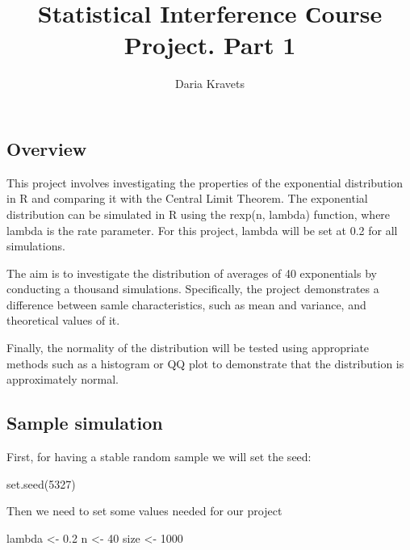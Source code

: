 \documentclass[
]{article}
\title{Statistical Interference Сourse Project. Part 1}
\author{Daria Kravets}
\date{}
\newenvironment{Shaded}{\begin{snugshade}}{\end{snugshade}}
\newcommand{\DecValTok}[1]{\textcolor[rgb]{0.00,0.00,0.81}{#1}}
\newcommand{\FloatTok}[1]{\textcolor[rgb]{0.00,0.00,0.81}{#1}}
\newcommand{\FunctionTok}[1]{\textcolor[rgb]{0.00,0.00,0.00}{#1}}
\newcommand{\NormalTok}[1]{#1}
\newcommand{\OtherTok}[1]{\textcolor[rgb]{0.56,0.35,0.01}{#1}}
\begin{document}
\maketitle

\hypertarget{overview}{%
\subsection{Overview}\label{overview}}

This project involves investigating the properties of the exponential
distribution in R and comparing it with the Central Limit Theorem. The
exponential distribution can be simulated in R using the rexp(n, lambda)
function, where lambda is the rate parameter. For this project, lambda
will be set at 0.2 for all simulations.

The aim is to investigate the distribution of averages of 40
exponentials by conducting a thousand simulations. Specifically, the
project demonstrates a difference between samle characteristics, such as
mean and variance, and theoretical values of it.

Finally, the normality of the distribution will be tested using
appropriate methods such as a histogram or QQ plot to demonstrate that
the distribution is approximately normal.

\hypertarget{sample-simulation}{%
\subsection{Sample simulation}\label{sample-simulation}}

First, for having a stable random sample we will set the seed:

\begin{Shaded}
\begin{Highlighting}[]
\FunctionTok{set.seed}\NormalTok{(}\DecValTok{5327}\NormalTok{)}
\end{Highlighting}
\end{Shaded}

Then we need to set some values needed for our project

\begin{Shaded}
\begin{Highlighting}[]
\NormalTok{lambda }\OtherTok{\textless{}{-}} \FloatTok{0.2}
\NormalTok{n }\OtherTok{\textless{}{-}} \DecValTok{40}
\NormalTok{size }\OtherTok{\textless{}{-}} \DecValTok{1000}
\end{Highlighting}
\end{Shaded}
\end{document}
